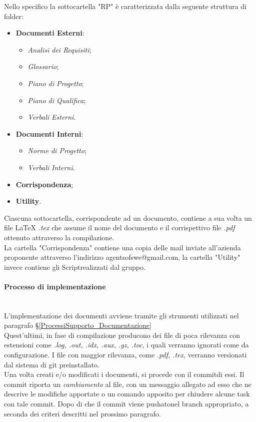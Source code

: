 	Nello specifico la sottocartella "RP" è caratterizzata dalla seguente struttura di folder:
	\begin{itemize}
	\item \textbf{Documenti Esterni}:
		\begin{itemize}
		\item \textit{Analisi dei Requisiti};
		\item \textit{Glossario};
		\item \textit{Piano di Progetto};
		\item \textit{Piano di Qualifica};
		\item \textit{Verbali Esterni}.
		\end{itemize}
	\item \textbf{Documenti Interni}:
		\begin{itemize}
		\item \textit{Norme di Progetto};
		\item \textit{Verbali Interni}.
		\end{itemize}
	\item \textbf{Corrispondenza};
	\item \textbf{Utility}.
	\end{itemize}
	Ciascuna sottocartella, corrispondente ad un documento, contiene a sua volta un file LaTeX \textit{.tex} che assume il nome del documento e il corrispettivo file \textit{.pdf} ottenuto attraverso la compilazione.\\
	La cartella "Corrispondenza" contiene una copia delle mail inviate all'azienda proponente attraverso l'indirizzo agentsofswe@gmail.com, la cartella "Utility" invece contiene gli Script\glossario realizzati dal gruppo.


\paragraph{Processo di implementazione} \-\\
L'implementazione dei documenti avviene tramite gli strumenti utilizzati nel paragrafo §\ref{ProcessiSupporto_Documentazione}\\
Quest'ultimi, in fase di compilazione producono dei file di poca rilevanza con estensioni come \textit{.log, .out, .idx, .aux, .gz, .toc}, i quali verranno ignorati come da configurazione. I file con maggior rilevanza, come \textit{.pdf, .tex}, verranno versionati dal sistema di git preinstallato. \\
Una volta creati e/o modificati i documenti, si procede con il commit\glossario di essi. Il commit riporta un \textit{cambiamento} al file, con un messaggio allegato ad esso che ne 
descrive le modifiche apportate o un comando apposito per chiudere alcune task con tale commit. Dopo di che il commit viene pushato\glossario nel branch appropriato, a seconda dei criteri descritti nel prossimo paragrafo. 

